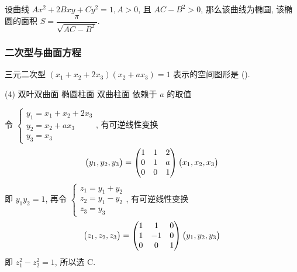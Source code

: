 \begin{inference}[一般椭圆面积公式]
    设曲线 $Ax^2+2Bxy+Cy^2=1,A>0$, 且 $AC-B^2>0$, 那么该曲线为椭圆, 该椭圆的面积 $S=\dfrac{\pi}{\sqrt{AC-B^2}}.$
\end{inference}

\subsubsection{二次型与曲面方程}

\begin{example}
    三元二次型 $(x_1+x_2+2x_3)(x_2+ax_3)=1$ 表示的空间图形是 (\quad).
    \begin{tasks}(4)
        \task 双叶双曲面
        \task 椭圆柱面
        \task 双曲柱面
        \task 依赖于 $a$ 的取值
    \end{tasks}
\end{example}
\begin{solution}
    令 $\begin{cases}
            y_1=x_1+x_2+2x_3 \\
            y_2=x_2+ax_3     \\
            y_3=x_3
        \end{cases}$, 有可逆线性变换 $$
        \mqty(y_1,y_2,y_3)=\begin{pmatrix} 1 & 1 & 2 \\ 0 & 1 & a \\ 0 & 0 & 1 \\\end{pmatrix}\mqty(x_1,x_2,x_3)
    $$
    即 $y_1y_2=1$, 再令 $\begin{cases}
            z_1=y_1+y_2 \\
            z_2=y_1-y_2 \\
            z_3=y_3
        \end{cases}$, 有可逆线性变换
    $$
        \mqty(z_1,z_2,z_3)=\begin{pmatrix} 1 & 1 & 0 \\ 1 & -1 & 0 \\ 0 & 0 & 1 \\\end{pmatrix}\mqty(y_1, y_2, y_3)
    $$
    即 $z_1^2-z_2^2=1$, 所以选 C.
\end{solution}

